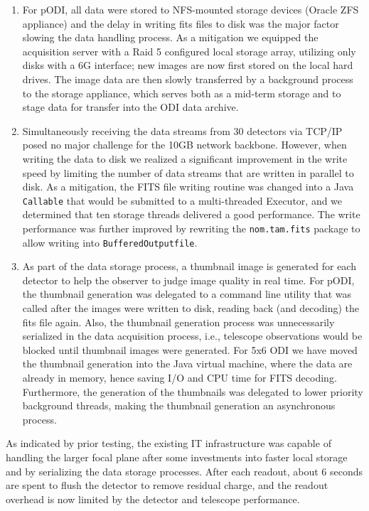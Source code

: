 \documentclass[]{spieman}
\begin{document}
\begin{enumerate} 
    
\item For pODI, all data were stored to NFS-mounted storage devices (Oracle ZFS
appliance) and the delay in  writing fits files to disk was the major factor 
slowing the data handling process. As a mitigation we equipped the acquisition
server with a Raid 5 configured local storage array, utilizing only disks with a
6G interface; new images are now first stored on the local hard drives. The
image data are then slowly transferred by a background process to the storage
appliance, which serves both as a mid-term storage and to stage data for transfer into the
ODI data archive.

\item   Simultaneously receiving the data streams from 30 detectors via
TCP/IP posed no major challenge for the 10GB network backbone.  However, when
writing the data to disk we realized a significant  improvement in the write
speed by limiting the number of data streams that are written in parallel to
disk. As a mitigation, the FITS file writing routine was changed into a Java
{\tt Callable} that would be submitted to a multi-threaded Executor, and we
determined that ten storage threads delivered a good performance. The write
performance was further improved by rewriting the {\tt nom.tam.fits} package to
allow writing into {\tt BufferedOutputfile}.

\item As part of the data storage process, a thumbnail image is generated for
each detector to help the observer to judge image quality in real time. For
pODI, the thumbnail generation was delegated to a command line utility that was
called after the images were written to disk, reading back (and decoding) the
fits file again. Also, the thumbnail generation process was unnecessarily
serialized in the data acquisition process, i.e., telescope observations would
be blocked until thumbnail images were generated.  For 5x6 ODI we have moved the
thumbnail generation into the Java virtual machine, where the data are already in
memory, hence saving I/O and CPU time for FITS decoding. Furthermore, the
generation of the thumbnails was delegated to  lower priority background
threads, making the thumbnail generation an asynchronous process.

    
\end{enumerate}

As indicated by prior testing, the existing IT infrastructure was capable of
handling the larger focal plane after some investments into faster local storage
and by serializing the data storage  processes.  After each readout, about 6
seconds are spent to flush the detector to remove residual charge, and the
readout overhead is now limited by the detector and telescope performance.
\end{document}
